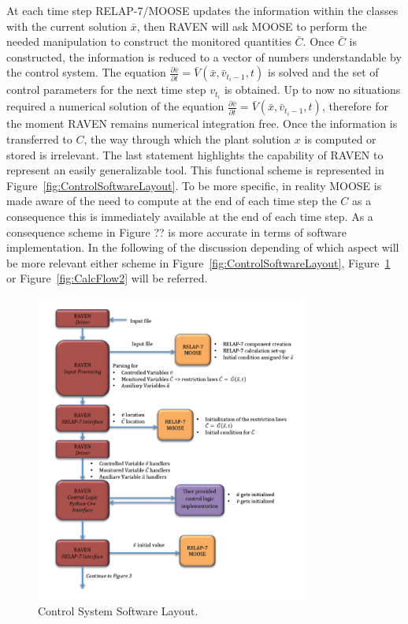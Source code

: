 \documentclass{mc2013}
\begin{document}
At each time step RELAP-7/MOOSE updates the information within the classes with the current solution  $\bar{x}$, then RAVEN will ask MOOSE to perform the needed manipulation to construct the monitored quantities $\bar{C}$. Once $\bar{C}$ is constructed, the information is reduced to a vector of
numbers understandable by the control system. 
The equation 
$\frac{\partial \bar{v}}{\partial t} = \bar{V}(\bar{x},\bar{v}_{t_{i}-1},t) $
is solved and the set of control parameters for the next time step $v_{t_{i}}$ is obtained. 
Up to now no situations required a numerical solution of the equation 
$\frac{\partial \bar{v}}{\partial t} = \bar{V}(\bar{x},\bar{v}_{t_{i}-1},t) $, therefore for the moment RAVEN remains numerical integration free. 
Once the information is transferred to $C$, the way through which the plant
solution $x$ is computed or stored is irrelevant. The last statement highlights the capability of RAVEN to
represent an easily generalizable tool. This functional scheme is represented in Figure~\ref{fig:ControlSoftwareLayout}.
To be more specific, in reality MOOSE is made aware of the need to compute at the end of each time step the $C$ as a consequence this is immediately available at the end of each time step. As a consequence scheme in Figure ?? is more accurate in terms of software implementation. In the following of the discussion depending of which aspect will be more relevant either scheme in Figure~\ref{fig:ControlSoftwareLayout}, Figure~\ref{fig:CalcFlow1} or Figure~\ref{fig:CalcFlow2} will be referred.

\begin{figure}[h] 
  \centering
     \includegraphics[width=0.8\textwidth]{figures/CalculationFlow_part_1.PNG}
  \caption{Control System Software Layout.}
  \label{fig:CalcFlow1}
\end{figure}
\end{document}
